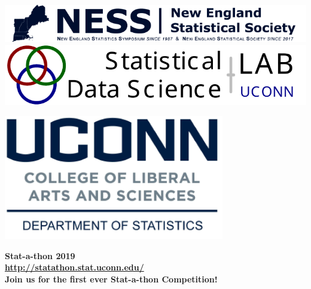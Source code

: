 \documentclass[12pt]{article}
\begin{document}
\pagestyle{empty}


\noindent
\begin{minipage}[m]{4in}
\includegraphics[width=\linewidth]{ness-banner}
\includegraphics[width=\linewidth]{tricircle}
\end{minipage}
\hfill
\begin{minipage}[m]{2.5in}
\includegraphics[width=\linewidth]{uconnstat-logo}
\end{minipage}

\bigskip

\begin{center}
  {\bf\Huge Stat-a-thon 2019}\\[1ex]
  {\bf\large \url{http://statathon.stat.uconn.edu/}}\\[1ex]
  {\bf\large  Join us for the first ever Stat-a-thon Competition!}
\end{center}

\vfill
\end{document}
